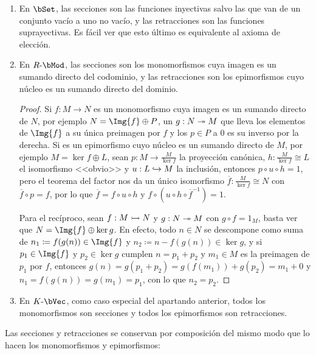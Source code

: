 \begin{example}\;
  \begin{enumerate}
  \item En $\bSet$, las secciones son las funciones inyectivas salvo las que van
    de un conjunto vacío a uno no vacío, y las retracciones son las funciones
    suprayectivas. Es fácil ver que esto último es equivalente al axioma de
    elección.
  \item En $R\dash\bMod$, las secciones son los monomorfismos cuya imagen es un
    sumando directo del codominio, y las retracciones son los epimorfismos cuyo
    núcleo es un sumando directo del dominio.
    \begin{proof}
      Si $f:M\to N$ es un monomorfismo cuya imagen es un sumando directo de
      $N$, por ejemplo $N=\Img{f}\oplus P$, un $g:N\twoheadrightarrow M$ que lleva los
      elementos de $\Img{f}$ a su única preimagen por $f$ y los $p\in P$ a 0 es
      su inverso por la derecha. Si es un epimorfismo cuyo núcleo es un sumando
      directo de $M$, por ejemplo $M=\ker{f}\oplus L$, sean
      $p:M\to\frac{M}{\ker{f}}$ la proyección canónica,
      $h:\frac{M}{\ker{f}}\cong L$ el isomorfismo <<obvio>> y $u:L\hookrightarrow M$ la
      inclusión, entonces $p\circ u\circ h=1$, pero el teorema del factor nos da
      un único isomorfismo $\overline{f}:\frac{M}{\ker{f}}\cong N$ con
      $\overline{f}\circ p=f$, por lo que $\overline{f}=f\circ u\circ h$ y
      $f\circ(u\circ h\circ\overline{f}^{-1})=1$.
      
      Para el recíproco, sean $f:M\rightarrowtail N$ y $g:N\twoheadrightarrow M$ con
      $g\circ f=1_M$, basta ver que $N=\Img{f}\oplus\ker{g}$. En efecto, todo
      $n\in N$ se descompone como suma de $n_1\coloneqq f(g(n))\in\Img{f}$ y
      $n_2\coloneqq n-f(g(n))\in\ker{g}$, y si $p_1\in\Img{f}$ y $p_2\in\ker{g}$
      cumplen $n=p_1+p_2$ y $m_1\in M$ es la preimagen de $p_1$ por $f$,
      entonces $g(n)=g(p_1+p_2)=g(f(m_1))+g(p_2)=m_1+0$ y
      $n_1=f(g(n))=g(m_1)=p_1$, con lo que $n_2=p_2$.
    \end{proof}
  \item En $K\dash\bVec$, como caso especial del apartando anterior, todos los
    monomorfismos son secciones y todos los epimorfismos son retracciones.
  \end{enumerate}
\end{example}

Las secciones y retracciones se conservan por composición del mismo modo que
lo hacen los monomorfismos y epimorfismos:

